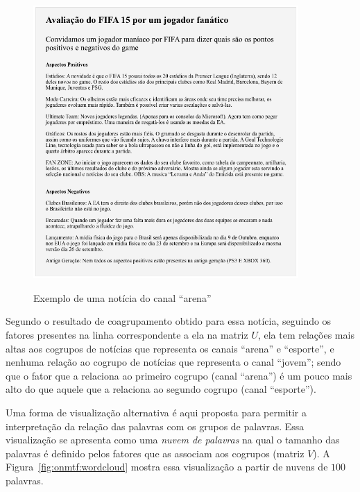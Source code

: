 \documentclass[
    12pt,                %
    oneside,            %
    a4paper,            %
    english,            %
    brazil                %
    ]{abntex2ppgsi}
\begin{document}
\begin{figure}[H]
    \centering
    \caption{Exemplo de uma notícia do canal ``arena''}
    \includegraphics[width=0.90\textwidth]{img/arenaNews.png}
    \label{fig:sample-news}
\end{figure}

Segundo o resultado de coagrupamento obtido para essa notícia, seguindo os fatores presentes na linha correspondente a ela na matriz $U$, ela tem relações mais altas aos cogrupos de notícias que representa os canais ``arena'' e ``esporte'', e nenhuma relação ao cogrupo de notícias que representa o canal ``jovem''; sendo que o fator que a relaciona ao primeiro cogrupo (canal ``arena'') é um pouco mais alto do que aquele que a relaciona ao segundo cogrupo (canal ``esporte'').


Uma forma de visualização alternativa é aqui proposta para permitir a interpretação da relação das palavras com os grupos de palavras. Essa visualização se apresenta como uma \textit{nuvem de palavras} na qual o tamanho das palavras é definido pelos fatores que as associam aos cogrupos (matriz $V$).
A Figura~\ref{fig:onmtf:wordcloud} mostra essa visualização a partir de nuvens de $100$ palavras.
\end{document}
